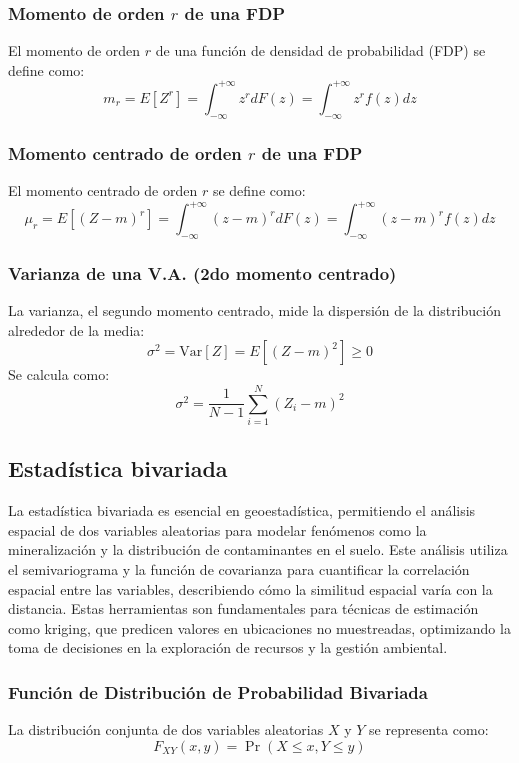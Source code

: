 \subsubsection{Momento de orden \( r \) de una FDP}
El momento de orden \( r \) de una función de densidad de probabilidad (FDP) se define como:
\[ m_r = E[Z^r] = \int_{-\infty}^{+\infty} z^r dF(z) = \int_{-\infty}^{+\infty} z^r f(z) dz \]

\subsubsection{Momento centrado de orden \( r \) de una FDP}
El momento centrado de orden \( r \) se define como:
\[ \mu_r = E[(Z - m)^r] = \int_{-\infty}^{+\infty} (z - m)^r dF(z) = \int_{-\infty}^{+\infty} (z - m)^r f(z) dz \]

\subsubsection{Varianza de una V.A. (2do momento centrado)}
La varianza, el segundo momento centrado, mide la dispersión de la distribución alrededor de la media:
\[ \sigma^2 = \text{Var}[Z] = E[(Z - m)^2] \geq 0 \]
Se calcula como:
\[ \sigma^2 = \frac{1}{N-1} \sum_{i=1}^{N} (Z_i - m)^2 \]


\subsection{Estadística bivariada}

La estadística bivariada es esencial en geoestadística, permitiendo el análisis espacial de dos variables aleatorias para modelar fenómenos como la mineralización y la distribución de contaminantes en el suelo. Este análisis utiliza el semivariograma y la función de covarianza para cuantificar la correlación espacial entre las variables, describiendo cómo la similitud espacial varía con la distancia. Estas herramientas son fundamentales para técnicas de estimación como kriging, que predicen valores en ubicaciones no muestreadas, optimizando la toma de decisiones en la exploración de recursos y la gestión ambiental.

\subsubsection{Función de Distribución de Probabilidad Bivariada}

La distribución conjunta de dos variables aleatorias \( X \) y \( Y \) se representa como:
\[
F_{XY}(x, y) = \Pr\left( X \leq x, Y \leq y \right)
\]


